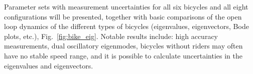 \documentclass{bmd2010a}
\begin{document}
Parameter sets with measurement uncertainties for all six bicycles and all
eight configurations  will be presented, together with basic comparisons of the
open loop dynamics of the different types of bicycles (eigenvalues,
eigenvectors, Bode plots, etc.), Fig.~\ref{fig:bike_eig}. Notable results
include: high accuracy
measurements, dual oscillatory eigenmodes, bicycles without riders may often
have no stable speed range, and it is possible to calculate uncertainties
in the eigenvalues and eigenvectors.



\end{document}
